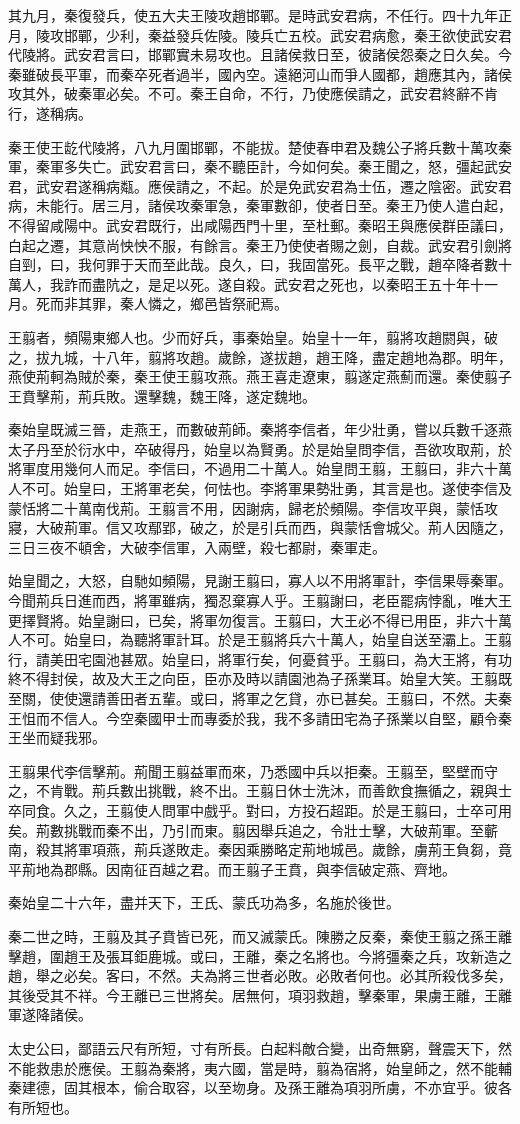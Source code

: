其九月，秦復發兵，使五大夫王陵攻趙邯鄲。是時武安君病，不任行。四十九年正月，陵攻邯鄲，少利，秦益發兵佐陵。陵兵亡五校。武安君病愈，秦王欲使武安君代陵將。武安君言曰，邯鄲實未易攻也。且諸侯救日至，彼諸侯怨秦之日久矣。今秦雖破長平軍，而秦卒死者過半，國內空。遠絕河山而爭人國都，趙應其內，諸侯攻其外，破秦軍必矣。不可。秦王自命，不行，乃使應侯請之，武安君終辭不肯行，遂稱病。

秦王使王龁代陵將，八九月圍邯鄲，不能拔。楚使春申君及魏公子將兵數十萬攻秦軍，秦軍多失亡。武安君言曰，秦不聽臣計，今如何矣。秦王聞之，怒，彊起武安君，武安君遂稱病甐。應侯請之，不起。於是免武安君為士伍，遷之陰密。武安君病，未能行。居三月，諸侯攻秦軍急，秦軍數卻，使者日至。秦王乃使人遣白起，不得留咸陽中。武安君既行，出咸陽西門十里，至杜郵。秦昭王與應侯群臣議曰，白起之遷，其意尚怏怏不服，有餘言。秦王乃使使者賜之劍，自裁。武安君引劍將自剄，曰，我何罪于天而至此哉。良久，曰，我固當死。長平之戰，趙卒降者數十萬人，我詐而盡阬之，是足以死。遂自殺。武安君之死也，以秦昭王五十年十一月。死而非其罪，秦人憐之，鄉邑皆祭祀焉。

王翦者，頻陽東鄉人也。少而好兵，事秦始皇。始皇十一年，翦將攻趙閼與，破之，拔九城，十八年，翦將攻趙。歲餘，遂拔趙，趙王降，盡定趙地為郡。明年，燕使荊軻為賊於秦，秦王使王翦攻燕。燕王喜走遼東，翦遂定燕薊而還。秦使翦子王賁擊荊，荊兵敗。還擊魏，魏王降，遂定魏地。

秦始皇既滅三晉，走燕王，而數破荊師。秦將李信者，年少壯勇，嘗以兵數千逐燕太子丹至於衍水中，卒破得丹，始皇以為賢勇。於是始皇問李信，吾欲攻取荊，於將軍度用幾何人而足。李信曰，不過用二十萬人。始皇問王翦，王翦曰，非六十萬人不可。始皇曰，王將軍老矣，何怯也。李將軍果勢壯勇，其言是也。遂使李信及蒙恬將二十萬南伐荊。王翦言不用，因謝病，歸老於頻陽。李信攻平與，蒙恬攻寢，大破荊軍。信又攻鄢郢，破之，於是引兵而西，與蒙恬會城父。荊人因隨之，三日三夜不頓舍，大破李信軍，入兩壁，殺七都尉，秦軍走。

始皇聞之，大怒，自馳如頻陽，見謝王翦曰，寡人以不用將軍計，李信果辱秦軍。今聞荊兵日進而西，將軍雖病，獨忍棄寡人乎。王翦謝曰，老臣罷病悖亂，唯大王更擇賢將。始皇謝曰，已矣，將軍勿復言。王翦曰，大王必不得已用臣，非六十萬人不可。始皇曰，為聽將軍計耳。於是王翦將兵六十萬人，始皇自送至灞上。王翦行，請美田宅園池甚眾。始皇曰，將軍行矣，何憂貧乎。王翦曰，為大王將，有功終不得封侯，故及大王之向臣，臣亦及時以請園池為子孫業耳。始皇大笑。王翦既至關，使使還請善田者五輩。或曰，將軍之乞貸，亦已甚矣。王翦曰，不然。夫秦王怚而不信人。今空秦國甲士而專委於我，我不多請田宅為子孫業以自堅，顧令秦王坐而疑我邪。

王翦果代李信擊荊。荊聞王翦益軍而來，乃悉國中兵以拒秦。王翦至，堅壁而守之，不肯戰。荊兵數出挑戰，終不出。王翦日休士洗沐，而善飲食撫循之，親與士卒同食。久之，王翦使人問軍中戲乎。對曰，方投石超距。於是王翦曰，士卒可用矣。荊數挑戰而秦不出，乃引而東。翦因舉兵追之，令壯士擊，大破荊軍。至蘄南，殺其將軍項燕，荊兵遂敗走。秦因乘勝略定荊地城邑。歲餘，虜荊王負芻，竟平荊地為郡縣。因南征百越之君。而王翦子王賁，與李信破定燕、齊地。

秦始皇二十六年，盡并天下，王氏、蒙氏功為多，名施於後世。

秦二世之時，王翦及其子賁皆已死，而又滅蒙氏。陳勝之反秦，秦使王翦之孫王離擊趙，圍趙王及張耳鉅鹿城。或曰，王離，秦之名將也。今將彊秦之兵，攻新造之趙，舉之必矣。客曰，不然。夫為將三世者必敗。必敗者何也。必其所殺伐多矣，其後受其不祥。今王離已三世將矣。居無何，項羽救趙，擊秦軍，果虜王離，王離軍遂降諸侯。

太史公曰，鄙語云尺有所短，寸有所長。白起料敵合變，出奇無窮，聲震天下，然不能救患於應侯。王翦為秦將，夷六國，當是時，翦為宿將，始皇師之，然不能輔秦建德，固其根本，偷合取容，以至圽身。及孫王離為項羽所虜，不亦宜乎。彼各有所短也。